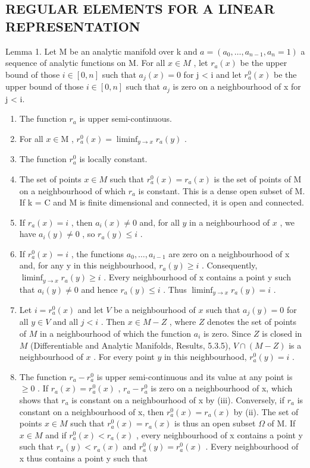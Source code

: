\subsection{REGULAR ELEMENTS FOR A LINEAR REPRESENTATION}

Lemma 1. Let M be an analytic manifold over k and \(a = (a_{0}, \ldots, a_{n-1}, a_{n} = 1)\) a sequence of analytic functions on M. For all \(x \in M\) , let \(r_{a}(x)\) be the upper bound of those \(i \in [0, n]\) such that \(a_{j}(x) = 0\) for j \textless{} i and let \(r_{a}^{0}(x)\) be the upper bound of those \(i \in [0, n]\) such that \(a_{j}\) is zero on a neighbourhood of x for j \textless{} i.

\begin{enumerate}
\def\labelenumi{(\roman{enumi})}
\item
  The function \(r_a\) is upper semi-continuous.
\item
  For all \(x \in \mathrm{M}\) , \(r_a^0(x) = \liminf_{y \to x} r_a(y)\) .
\item
  The function \(r_a^0\) is locally constant.
\item
  The set of points \(x \in M\) such that \(r_{a}^{0}(x) = r_{a}(x)\) is the set of points of M on a neighbourhood of which \(r_{a}\) is constant. This is a dense open subset of M. If k = C and M is finite dimensional and connected, it is open and connected.
\item
  If \(r_a(x) = i\) , then \(a_i(x) \neq 0\) and, for all \(y\) in a neighbourhood of \(x\) , we have \(a_i(y) \neq 0\) , so \(r_a(y) \leq i\) .
\item
  If \(r_{a}^{0}(x) = i\) , the functions \(a_{0}, \ldots, a_{i-1}\) are zero on a neighbourhood of x and, for any y in this neighbourhood, \(r_{a}(y) \geq i\) . Consequently, \(\liminf_{y \to x} r_{a}(y) \geq i\) . Every neighbourhood of x contains a point y such that \(a_{i}(y) \neq 0\) and hence \(r_{a}(y) \leq i\) . Thus \(\liminf_{y \to x} r_{a}(y) = i\) .
\item
  Let \(i = r_a^0 (x)\) and let \(V\) be a neighbourhood of \(x\) such that \(a_{j}(y) = 0\) for all \(y\in V\) and all \(j < i\) . Then \(x\in M - Z\) , where \(Z\) denotes the set of points of \(M\) in a neighbourhood of which the function \(a_{i}\) is zero. Since \(Z\) is closed in \(M\) (Differentiable and Analytic Manifolds, Results, 5.3.5), \(V\cap (M - Z)\) is a neighbourhood of \(x\) . For every point \(y\) in this neighbourhood, \(r_a^0 (y) = i\) .
\item
  The function \(r_{a}-r_{a}^{0}\) is upper semi-continuous and its value at any point is \(\geq0\) . If \(r_{a}(x)=r_{a}^{0}(x)\) , \(r_{a}-r_{a}^{0}\) is zero on a neighbourhood of x, which shows that \(r_{a}\) is constant on a neighbourhood of x by (iii). Conversely, if \(r_{a}\) is constant on a neighbourhood of x, then \(r_{a}^{0}(x)=r_{a}(x)\) by (ii). The set of points \(x\in M\) such that \(r_{a}^{0}(x)=r_{a}(x)\) is thus an open subset \(\Omega\) of M. If \(x\in M\) and if \(r_{a}^{0}(x)<r_{a}(x)\) , every neighbourhood of x contains a point y such that \(r_{a}(y)<r_{a}(x)\) and \(r_{a}^{0}(y)=r_{a}^{0}(x)\) . Every neighbourhood of x thus contains a point y such that
\end{enumerate}

